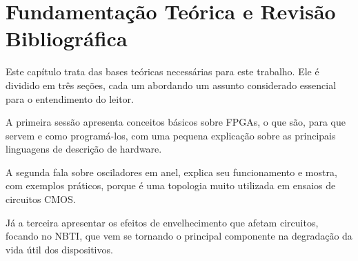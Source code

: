 \chapter{Fundamentação Teórica e Revisão Bibliográfica}
\label{sec:Referencial}

Este capítulo trata das bases teóricas necessárias para este trabalho. Ele é dividido em três seções, cada um abordando um assunto considerado essencial para o entendimento do leitor.

A primeira sessão apresenta conceitos básicos sobre FPGAs, o que são, para que servem e como programá-los, com uma pequena explicação sobre as principais linguagens de descrição de hardware.

A segunda fala sobre osciladores em anel, explica seu funcionamento e mostra, com exemplos práticos, porque é uma topologia muito utilizada em ensaios de circuitos CMOS.

Já a terceira apresentar os efeitos de envelhecimento que afetam circuitos, focando no NBTI, que vem se tornando o principal componente na degradação da vida útil dos dispositivos.



